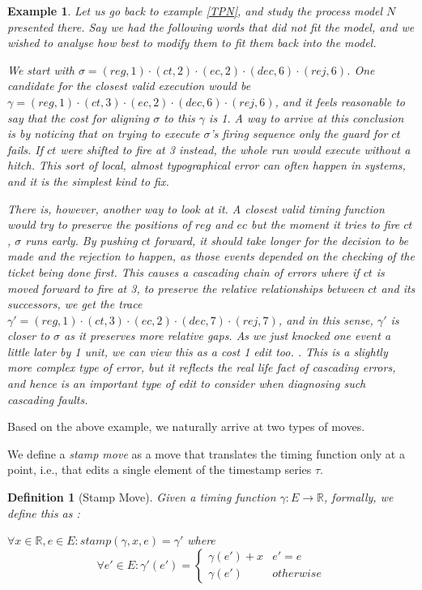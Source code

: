 \documentclass[conference]{IEEEtran}
\newcounter{cases}
\newtheorem{definition}{Definition}
\newtheorem{example}{Example}
\begin{document}
\begin{example}
	Let us go back to example \ref{TPN}, and study the process model $N$ presented there. 
Say we had the following words that did not fit the model, and we wished to analyse how best to modify them to fit them back into the model. 
	
	We start with $\sigma = (reg, 1)\cdot  (ct, 2)  \cdot (ec, 2) \cdot (dec, 6) \cdot (rej, 6)$. 
	One candidate for the closest valid execution would be $\gamma = (reg, 1)\cdot  (ct, 3)  \cdot (ec, 2) \cdot (dec, 6) \cdot (rej, 6)$, and it feels reasonable to say that the cost for aligning $\sigma$ to this $\gamma$ is 1. 
	A way to arrive at this conclusion is by noticing that on trying to execute $\sigma$'s firing sequence only the guard for $ct$ fails. If $ct$ were shifted to fire at 3 instead, the whole run would execute without a hitch. This sort of local, almost typographical error can often happen in systems, and it is the simplest kind to fix.  

	There is, however, another way to look at it. A closest valid timing function would try to preserve the positions of $reg$ and  $ec$ but the moment it tries to fire $ct$, $\sigma$ runs early. By pushing $ct$ forward, it should take longer for the decision to be made and the rejection to happen, as those events depended on the checking of the ticket being done first. 
	This causes a cascading chain of errors where if $ct$ is moved forward to fire at 3, to preserve the relative relationships between $ct$ and its successors, we get the trace $\gamma' = (reg, 1)\cdot  (ct, 3)  \cdot (ec, 2) \cdot (dec, 7) \cdot (rej, 7)$, and in this sense, $\gamma'$ is closer to $\sigma$ as it preserves more relative gaps. As we just knocked one event a little later by 1 unit, we can view this as a cost 1 edit too.  
	. 
	This is a slightly more complex type of error, but it reflects the real life fact of cascading errors, and hence is an important type of edit to consider when diagnosing such cascading faults. 
\end{example}

Based on the above example, we naturally arrive at two types of moves. 

We define a \textit{stamp move} as a move that translates the timing function only at a point, i.e., that edits a single element of the timestamp series $\tau$. 

\begin{definition}[Stamp Move]
	Given a timing function $\gamma : E \to \mathbb{R}$, formally, we define this as : 
	
	$\forall x \in \mathbb{R}, e \in E : stamp(\gamma, x, e) =\gamma' $ where
	$$\forall e' \in E : \gamma'(e')  = \begin{cases}
		\gamma(e') + x & e' = e \\
		\gamma(e')& otherwise
	\end{cases}$$
	
\end{definition}
\end{document}
